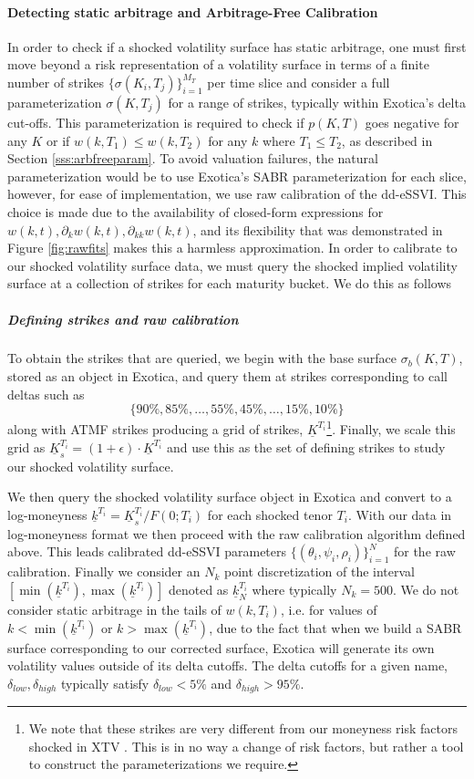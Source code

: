 \documentclass[11pt,letterpaper]{article}
\begin{document}
\paragraph{Detecting static arbitrage and Arbitrage-Free Calibration}
In order to check if a shocked volatility surface has static arbitrage, one must first move beyond a risk representation of a volatility surface in terms of a finite number of strikes $\{ \sigma(K_i,T_j)\}_{i=1}^{M_T}$ per time slice and consider a full parameterization $\sigma(K,T_j)$ for a range of strikes, typically within Exotica's delta cut-offs. This parameterization is required to check if $p(K,T)$ goes negative for any $K$ or if $w(k,T_1) \leq w(k,T_2)$ for any $k$ where $T_1 \leq T_2$, as described in Section \ref{sss:arbfreeparam}. To avoid valuation failures, the natural parameterization would be to use Exotica's SABR parameterization for each slice, however, for ease of implementation, we use raw calibration of the dd-eSSVI. This choice is made due to the availability of closed-form expressions for $w(k,t), \partial_kw(k,t), \partial_{kk}w(k,t)$, and its flexibility that was demonstrated in Figure \ref{fig:rawfits} makes this a harmless approximation. In order to calibrate to our shocked volatility surface data, we must query the shocked implied volatility surface at a collection of strikes for each maturity bucket. We do this as follows

\subparagraph{Defining strikes and raw calibration} To obtain the strikes that are queried, we begin with the base surface $\sigma_b(K,T)$, stored as an object in Exotica, and query them at strikes corresponding to call deltas such as
\[
\{90\%, 85 \%, \ldots, 55 \%, 45 \%, \ldots, 15 \% , 10 \% \}
\]
along with ATMF strikes producing a grid of strikes, $\underline{K}^{T_i}$\footnote{We note that these strikes are very different from our moneyness risk factors shocked in XTV \cite{xtv}. This is in no way a change of risk factors, but rather a tool to construct the parameterizations we require. }. Finally, we scale this grid as $\underline{K}^{T_i}_{s} = (1 + \epsilon) \cdot \underline{K}^{T_i}$ and use this as the set of defining strikes to study our shocked volatility surface. 

We then query the shocked volatility surface object in Exotica and convert to a log-moneyness $\underline{k}^{T_i} = \underline{K}^{T_i}_s/F(0;T_i)$ for each shocked tenor $T_i$. With our data in log-moneyness format we then proceed with the raw calibration algorithm defined above. This leads calibrated dd-eSSVI parameters $\{(\theta_i,\psi_i,\rho_i)\}_{i=1}^N$ for the raw calibration. Finally we consider an $N_k$ point discretization of the interval $[\min(\underline{k}^{T_i}), \max(\underline{k}^{T_i})   ]$ denoted as $\underline{k}^{T_i}_N$ where typically $N_k = 500$. We do not consider static arbitrage in the tails of $w(k,T_i)$, i.e. for values of $k <  \min(\underline{k}^{T_i})$ or $k > \max(\underline{k}^{T_i})$, due to the fact that when we build a SABR surface corresponding to our corrected surface, Exotica will generate its own volatility values outside of its delta cutoffs. The delta cutoffs for a given name, $\delta_{low}, \delta_{high}$ typically satisfy $\delta_{low} < 5\%$ and $\delta_{high} > 95\%$. 
\end{document}
